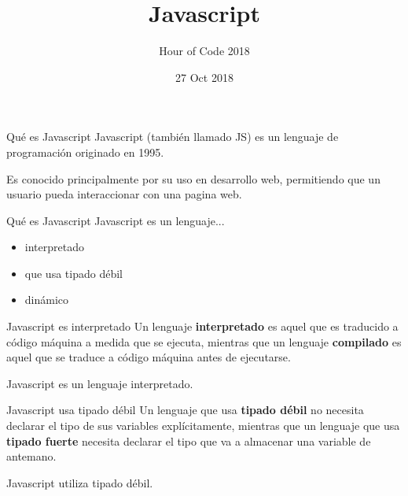 \documentclass{beamer}
\title{Javascript}
\subtitle{Hour of Code 2018}
\institute{Universidad de Valladolid}
\date{27 Oct 2018}
\begin{document}
\begin{frame}
        \maketitle
\end{frame}
    \setlength{\parskip}{\baselineskip}%
    \setlength{\parindent}{0pt}%

\begin{frame}{Qué es Javascript}
    	\pause
        Javascript (también llamado JS) es un lenguaje de programación originado en 1995.\pause

    	Es conocido principalmente por su uso en desarrollo web, permitiendo que un usuario pueda interaccionar con una pagina web.
\end{frame}
\begin{frame}{Qué es Javascript}
        Javascript es un lenguaje... \bigskip
        \begin{itemize}
            \item interpretado\pause
            \item que usa tipado débil\pause
            \item dinámico
    \end{itemize}
\end{frame}
    
\begin{frame}{Javascript es interpretado}
        \pause
        Un lenguaje \textbf{interpretado} es aquel que es traducido a código máquina a medida que se ejecuta, mientras que un lenguaje \textbf{compilado} es aquel que se traduce a código máquina antes de ejecutarse.\pause
        \centering
        
        Javascript es un lenguaje interpretado.
\end{frame}
    
\begin{frame}{Javascript usa tipado débil}
        \pause
        Un lenguaje que usa \textbf{tipado débil} no necesita declarar el tipo de sus variables explícitamente, mientras que un lenguaje que usa \textbf{tipado fuerte} necesita declarar el tipo que va a almacenar una variable de antemano.\pause
        \centering
        
        Javascript utiliza tipado débil.
\end{frame}
    
    
    
\end{document}
